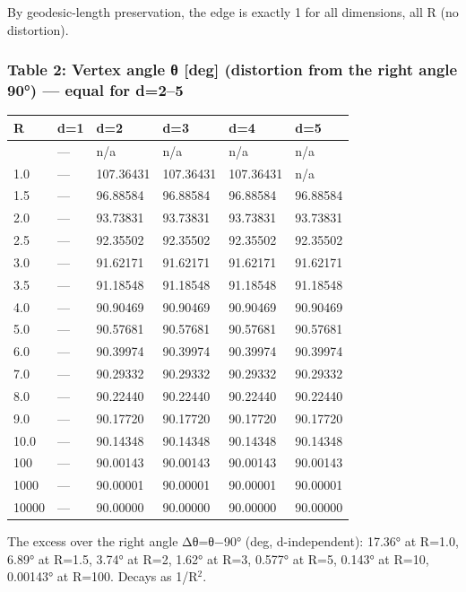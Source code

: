 \documentclass[
]{ltjsarticle}
\newcounter{none} %
\begin{document}
By geodesic-length preservation, the edge is exactly 1 for all
dimensions, all R (no distortion).

\subsubsection{Table 2: Vertex angle θ {[}deg{]} (distortion from the
right angle 90°) --- equal for
d=2--5}\label{table-2-vertex-angle-ux3b8-deg-distortion-from-the-right-angle-90-equal-for-d25}

{\def\LTcaptype{none} %
\begin{longtable}[]{@{}llllll@{}}
\toprule\noalign{}
R & d=1 & d=2 & d=3 & d=4 & d=5 \\
\midrule\noalign{}
\endhead
\bottomrule\noalign{}
\endlastfoot
0.5 & --- & n/a & n/a & n/a & n/a \\
1.0 & --- & 107.36431 & 107.36431 & 107.36431 & n/a \\
1.5 & --- & 96.88584 & 96.88584 & 96.88584 & 96.88584 \\
2.0 & --- & 93.73831 & 93.73831 & 93.73831 & 93.73831 \\
2.5 & --- & 92.35502 & 92.35502 & 92.35502 & 92.35502 \\
3.0 & --- & 91.62171 & 91.62171 & 91.62171 & 91.62171 \\
3.5 & --- & 91.18548 & 91.18548 & 91.18548 & 91.18548 \\
4.0 & --- & 90.90469 & 90.90469 & 90.90469 & 90.90469 \\
5.0 & --- & 90.57681 & 90.57681 & 90.57681 & 90.57681 \\
6.0 & --- & 90.39974 & 90.39974 & 90.39974 & 90.39974 \\
7.0 & --- & 90.29332 & 90.29332 & 90.29332 & 90.29332 \\
8.0 & --- & 90.22440 & 90.22440 & 90.22440 & 90.22440 \\
9.0 & --- & 90.17720 & 90.17720 & 90.17720 & 90.17720 \\
10.0 & --- & 90.14348 & 90.14348 & 90.14348 & 90.14348 \\
100 & --- & 90.00143 & 90.00143 & 90.00143 & 90.00143 \\
1000 & --- & 90.00001 & 90.00001 & 90.00001 & 90.00001 \\
10000 & --- & 90.00000 & 90.00000 & 90.00000 & 90.00000 \\
\end{longtable}
}

The excess over the right angle Δθ=θ−90° (deg, d-independent): 17.36° at
R=1.0, 6.89° at R=1.5, 3.74° at R=2, 1.62° at R=3, 0.577° at R=5, 0.143°
at R=10, 0.00143° at R=100. Decays as 1/R\(^{2}\).
\end{document}
